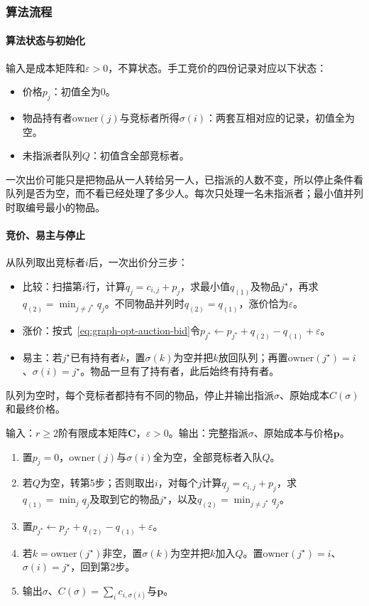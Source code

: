 \subsubsection{算法流程}

\paragraph{算法状态与初始化}
输入是成本矩阵和$\varepsilon>0$，不算状态。手工竞价的四份记录对应以下状态：
\begin{itemize}
  \item 价格$p_j$：初值全为$0$。
  \item 物品持有者$\mathrm{owner}(j)$与竞标者所得$\sigma(i)$：两套互相对应的记录，初值全为空。
  \item 未指派者队列$Q$：初值含全部竞标者。
\end{itemize}
一次出价可能只是把物品从一人转给另一人，已指派的人数不变，所以停止条件看队列是否为空，而不看已经处理了多少人。每次只处理一名未指派者；最小值并列时取编号最小的物品。

\paragraph{竞价、易主与停止}
从队列取出竞标者$i$后，一次出价分三步：
\begin{itemize}
  \item 比较：扫描第$i$行，计算$q_j=c_{i,j}+p_j$，求最小值$q_{(1)}$及物品$j^\star$，再求$q_{(2)}=\min_{j\neq j^\star}q_j$。不同物品并列时$q_{(2)}=q_{(1)}$，涨价恰为$\varepsilon$。
  \item 涨价：按式~\eqref{eq:graph-opt-auction-bid}令$p_{j^\star}\gets p_{j^\star}+q_{(2)}-q_{(1)}+\varepsilon$。
  \item 易主：若$j^\star$已有持有者$k$，置$\sigma(k)$为空并把$k$放回队列；再置$\mathrm{owner}(j^\star)=i$、$\sigma(i)=j^\star$。物品一旦有了持有者，此后始终有持有者。
\end{itemize}
队列为空时，每个竞标者都持有不同的物品，停止并输出指派$\sigma$、原始成本$C(\sigma)$和最终价格。

\begin{algorithm}[Auction算法]
\label{alg:graph-opt-auction}
输入：$r\geq2$阶有限成本矩阵$\bm C$，$\varepsilon>0$。输出：完整指派$\sigma$、原始成本与价格$\bm p$。
\begin{enumerate}
  \item 置$p_j=0$，$\mathrm{owner}(j)$与$\sigma(i)$全为空，全部竞标者入队$Q$。
  \item 若$Q$为空，转第5步；否则取出$i$，对每个$j$计算$q_j=c_{i,j}+p_j$，求$q_{(1)}=\min_jq_j$及取到它的物品$j^\star$，以及$q_{(2)}=\min_{j\neq j^\star}q_j$。
  \item 置$p_{j^\star}\gets p_{j^\star}+q_{(2)}-q_{(1)}+\varepsilon$。
  \item 若$k=\mathrm{owner}(j^\star)$非空，置$\sigma(k)$为空并把$k$加入$Q$。置$\mathrm{owner}(j^\star)=i$、$\sigma(i)=j^\star$，回到第2步。
  \item 输出$\sigma$、$C(\sigma)=\sum_ic_{i,\sigma(i)}$与$\bm p$。
\end{enumerate}
\end{algorithm}

